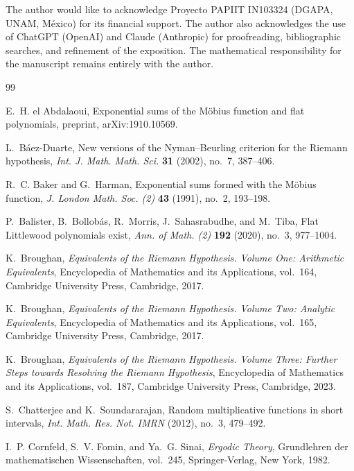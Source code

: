 \documentclass[11pt]{article}
\theoremstyle{remark}
\begin{document}
The author would like to acknowledge Proyecto PAPIIT IN103324
(DGAPA, UNAM, M\'exico) for its financial support.  The author also
acknowledges the use of ChatGPT (OpenAI) and Claude (Anthropic) for
proofreading, bibliographic searches, and refinement of the exposition.
The mathematical responsibility for the manuscript remains entirely
with the author.



\begin{thebibliography}{99}

E.~H. el Abdalaoui,
\newblock Exponential sums of the M\"obius function and flat polynomials,
\newblock preprint, arXiv:1910.10569.

L.~B\'aez-Duarte,
\newblock New versions of the Nyman--Beurling criterion for the
Riemann hypothesis,
\newblock \emph{Int. J. Math. Math. Sci.}
\textbf{31} (2002), no.~7, 387--406.

R.~C. Baker and G.~Harman,
\newblock Exponential sums formed with the M\"obius function,
\newblock \emph{J. London Math. Soc. (2)}
\textbf{43} (1991), no.~2, 193--198.

P.~Balister, B.~Bollob\'as, R.~Morris, J.~Sahasrabudhe, and M.~Tiba,
\newblock Flat Littlewood polynomials exist,
\newblock \emph{Ann. of Math. (2)}
\textbf{192} (2020), no.~3, 977--1004.

K.~Broughan,
\emph{Equivalents of the Riemann Hypothesis. Volume One: Arithmetic Equivalents},
Encyclopedia of Mathematics and its Applications, vol.~164,
Cambridge University Press, Cambridge, 2017.

K.~Broughan,
\emph{Equivalents of the Riemann Hypothesis. Volume Two: Analytic Equivalents},
Encyclopedia of Mathematics and its Applications, vol.~165,
Cambridge University Press, Cambridge, 2017.

K.~Broughan,
\emph{Equivalents of the Riemann Hypothesis. Volume Three: Further Steps towards Resolving the Riemann Hypothesis},
Encyclopedia of Mathematics and its Applications, vol.~187,
Cambridge University Press, Cambridge, 2023.

S.~Chatterjee and K.~Soundararajan,
Random multiplicative functions in short intervals,
\emph{Int. Math. Res. Not. IMRN} (2012), no.~3, 479--492.

I.~P. Cornfeld, S.~V. Fomin, and Ya.~G. Sinai,
\newblock \emph{Ergodic Theory},
\newblock Grundlehren der mathematischen Wissenschaften, vol.~245,
Springer-Verlag, New York, 1982.


\end{thebibliography}
\end{document}
